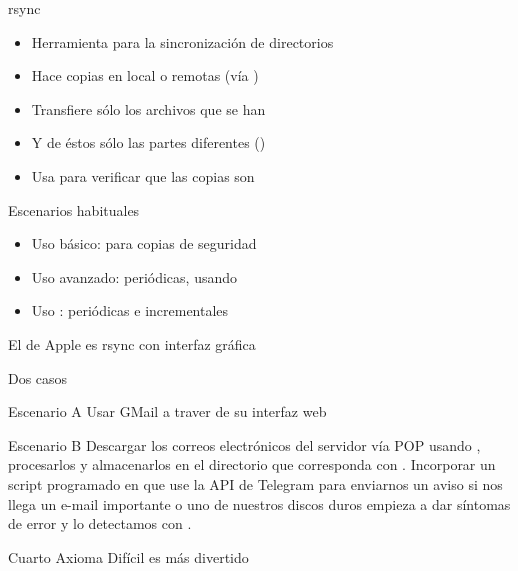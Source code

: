 \documentclass[14pt]{beamer}
\begin{document}
\begin{frame}{rsync}

  \begin{itemize} \itemsep0em
    \item Herramienta  para la sincronización
      de directorios
    \item Hace copias en local o remotas (vía )
    \item Transfiere sólo los archivos que se han 
    \item Y de éstos sólo las partes diferentes
      ()
    \item Usa  para verificar que las copias son
  \end{itemize}

  \begin{alertblock}{\centering \footnotesize Escenarios habituales}
    \begin{itemize} \itemsep0em
      \footnotesize
      \item Uso básico: para copias de seguridad
      \item Uso avanzado: periódicas, usando 
      \item Uso : periódicas e incrementales
    \end{itemize}
  \end{alertblock}

  \begin{block}{}
    \centering \small
    El  de Apple es rsync con interfaz gráfica
  \end{block}

\end{frame}

\begin{frame}{Dos casos}

  \begin{exampleblock}{Escenario A}\centering
   \small Usar GMail a traver de su interfaz web
   \end{exampleblock}

  \begin{block}{Escenario B} \centering
    \small Descargar los correos electrónicos del servidor vía POP
    usando , procesarlos y almacenarlos en el
    directorio que corresponda con . Incorporar un
    script programado en  que use la API de Telegram
    para enviarnos un aviso si nos llega un e-mail importante o uno de
    nuestros discos duros empieza a dar síntomas de error y lo
    detectamos con .
   \end{block}

  \begin{alertblock}{\centering Cuarto Axioma}
    \centering Difícil es más divertido
  \end{alertblock}

\end{frame}
\end{document}
